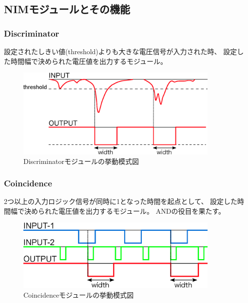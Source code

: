\documentclass{jarticle}
\begin{document}
  
  \subsection{NIMモジュールとその機能}

    \subsubsection*{Discriminator}
	  
	  設定されたしきい値(threshold)よりも大きな電圧信号が入力された時、
	  設定した時間幅で決められた電圧値を出力するモジュール。
 	  
	  \begin{figure}[htbp]
	   \begin{center}
	    \includegraphics[width = 100mm]{./picture/Discriminator.eps}
	   \end{center}
	   \caption{Discriminatorモジュールの挙動模式図}
	   \label{Fig:Discri}
	  \end{figure}
	  
    	  \subsubsection*{Coincidence}
	  
	  2つ以上の入力ロジック信号が同時に1となった時間を起点として、
	  設定した時間幅で決められた電圧値を出力するモジュール。
	  ANDの役目を果たす。
	  
	  \begin{figure}[htbp]
	   \begin{center}
	    \includegraphics[width = 100mm]{./picture/Coincidence.eps}
	   \end{center}
	   \caption{Coincidenceモジュールの挙動模式図}
	   \label{Fig:Coincidence}
	  \end{figure}
	  
\end{document}
